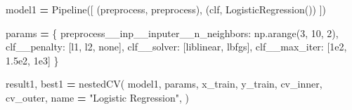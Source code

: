 \documentclass[
]{article}
\newenvironment{Shaded}{\begin{snugshade}}{\end{snugshade}}
\newcommand{\DecValTok}[1]{\textcolor[rgb]{0.00,0.00,0.81}{#1}}
\newcommand{\FloatTok}[1]{\textcolor[rgb]{0.00,0.00,0.81}{#1}}
\newcommand{\NormalTok}[1]{#1}
\newcommand{\OperatorTok}[1]{\textcolor[rgb]{0.81,0.36,0.00}{\textbf{#1}}}
\newcommand{\StringTok}[1]{\textcolor[rgb]{0.31,0.60,0.02}{#1}}
\begin{document}
\begin{Shaded}
\begin{Highlighting}[]
\NormalTok{model1 }\OperatorTok{=}\NormalTok{ Pipeline([}
\NormalTok{    (}\StringTok{\textquotesingle{}preprocess\textquotesingle{}}\NormalTok{, preprocess),}
\NormalTok{    (}\StringTok{\textquotesingle{}clf\textquotesingle{}}\NormalTok{, LogisticRegression())}
\NormalTok{])}

\NormalTok{params }\OperatorTok{=}\NormalTok{ \{}
    \StringTok{\textquotesingle{}preprocess\_\_inp\_\_inputer\_\_n\_neighbors\textquotesingle{}}\NormalTok{: np.arange(}\DecValTok{3}\NormalTok{, }\DecValTok{10}\NormalTok{, }\DecValTok{2}\NormalTok{),}
    \StringTok{\textquotesingle{}clf\_\_penalty\textquotesingle{}}\NormalTok{: [}\StringTok{\textquotesingle{}l1\textquotesingle{}}\NormalTok{, }\StringTok{\textquotesingle{}l2\textquotesingle{}}\NormalTok{, }\StringTok{\textquotesingle{}none\textquotesingle{}}\NormalTok{],}
    \StringTok{\textquotesingle{}clf\_\_solver\textquotesingle{}}\NormalTok{: [}\StringTok{\textquotesingle{}liblinear\textquotesingle{}}\NormalTok{, }\StringTok{\textquotesingle{}lbfgs\textquotesingle{}}\NormalTok{],}
    \StringTok{\textquotesingle{}clf\_\_max\_iter\textquotesingle{}}\NormalTok{: [}\FloatTok{1e2}\NormalTok{, }\FloatTok{1.5e2}\NormalTok{, }\FloatTok{1e3}\NormalTok{]}
\NormalTok{\}}

\NormalTok{result1, best1 }\OperatorTok{=}\NormalTok{ nestedCV(}
\NormalTok{    model1, params, x\_train, y\_train,}
\NormalTok{    cv\_inner, cv\_outer, name }\OperatorTok{=} \StringTok{"Logistic Regression"}\NormalTok{,}
\NormalTok{)}
\end{Highlighting}
\end{Shaded}

\begin{table}

\caption{\label{tab:unnamed-chunk-29}Best hyperparameters for logistic regression}
\centering
{}
\end{table}
\end{document}

